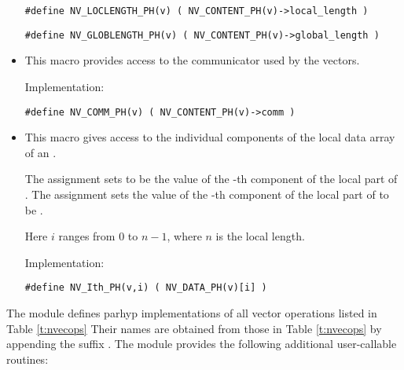 \begin{itemize}
  \verb|#define NV_LOCLENGTH_PH(v) ( NV_CONTENT_PH(v)->local_length )|

  \verb|#define NV_GLOBLENGTH_PH(v) ( NV_CONTENT_PH(v)->global_length )|
  
\item {}

  This macro provides access to the {\mpi} communicator used by the {\nvecph}
  vectors.

  Implementation:

  \verb|#define NV_COMM_PH(v) ( NV_CONTENT_PH(v)->comm )|

\item {}

  This macro gives access to the individual components of the local data
  array of an .

  The assignment  sets  to be the value of 
  the -th component of the local part of . 
  The assignment    
  sets the value of the -th component of the local part of  
  to be .        
  
  Here $i$ ranges from $0$ to $n-1$, where $n$ is the local length.
      
  Implementation:

  \verb|#define NV_Ith_PH(v,i) ( NV_DATA_PH(v)[i] )|

\end{itemize}
The {\nvecph} module defines parhyp implementations of all vector operations listed 
in Table \ref{t:nvecops}  Their names are obtained from those in Table \ref{t:nvecops} by
appending the suffix . The module {\nvecph} provides the following additional
user-callable routines:
